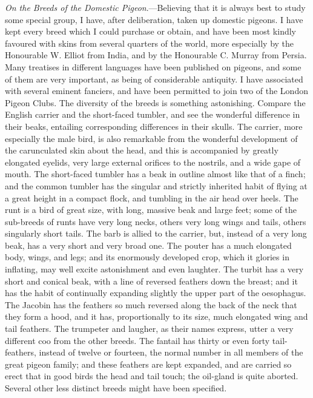 \documentclass{book}
\begin{document}
\emph{On the Breeds of the Domestic Pigeon}.---Believing that it is always
best to study some special group, I have, after deliberation, taken up domestic
pigeons. I have kept every breed which I could purchase or obtain, and have
been most kindly favoured with skins from several quarters of the world, more
especially by the Honourable W. Elliot from India, and by the Honourable C.
Murray from Persia. Many treatises in different languages have been published
on pigeons, and some of them are very important, as being of considerable
antiquity. I have associated with several eminent fanciers, and have been
permitted to join two
of the London Pigeon Clubs. The diversity of the breeds is something
astonishing. Compare the English carrier and the short-faced tumbler, and see
the wonderful difference in their beaks, entailing corresponding differences in
their skulls. The carrier, more especially the male bird, is also remarkable
from the wonderful development of the carunculated skin about the head, and
this is accompanied by greatly elongated eyelids, very large external orifices
to the nostrils, and a wide gape of mouth. The short-faced tumbler has a beak
in outline almost like that of a finch; and the common tumbler has the singular
and strictly inherited habit of flying at a great height in a compact flock,
and tumbling in the air head over heels. The runt is a bird of great size, with
long, massive beak and large feet; some of the sub-breeds of runts have very
long necks, others very long wings and tails, others singularly short tails.
The barb is allied to the carrier, but, instead of a very long beak, has a very
short and very broad one. The pouter has a much elongated body, wings, and
legs; and its enormously developed crop, which it glories in inflating, may
well excite astonishment and even laughter. The turbit has a very short and
conical beak, with a line of reversed feathers down the breast; and it has the
habit of continually expanding slightly the upper part of the oesophagus. The
Jacobin has the feathers so much reversed along the back of the neck that they
form a hood, and it has, proportionally to its size, much elongated wing and
tail feathers. The trumpeter and laugher, as their names express, utter a very
different coo from the other breeds. The fantail has thirty or even forty
tail-feathers, instead of twelve or fourteen, the normal number in all members
of the great pigeon family; and these feathers are kept expanded, and are
carried so erect that in good birds the head and tail
touch; the oil-gland is quite aborted. Several other less distinct breeds might
have been specified.
\end{document}
